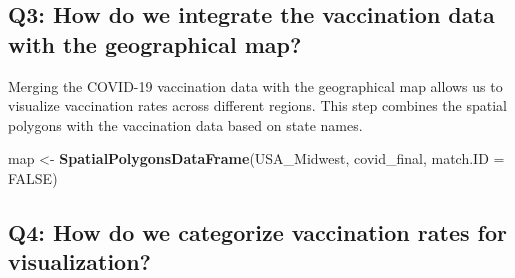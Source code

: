 \documentclass[
]{book}
\newenvironment{Shaded}{\begin{snugshade}}{\end{snugshade}}
\newcommand{\AttributeTok}[1]{\textcolor[rgb]{0.13,0.29,0.53}{#1}}
\newcommand{\ConstantTok}[1]{\textcolor[rgb]{0.56,0.35,0.01}{#1}}
\newcommand{\FunctionTok}[1]{\textcolor[rgb]{0.13,0.29,0.53}{\textbf{#1}}}
\newcommand{\NormalTok}[1]{#1}
\newcommand{\OtherTok}[1]{\textcolor[rgb]{0.56,0.35,0.01}{#1}}
\newcommand{\SpecialCharTok}[1]{\textcolor[rgb]{0.81,0.36,0.00}{\textbf{#1}}}
\newcommand{\StringTok}[1]{\textcolor[rgb]{0.31,0.60,0.02}{#1}}
\begin{document}
\begin{Shaded}
\end{Shaded}

\hypertarget{q3-how-do-we-integrate-the-vaccination-data-with-the-geographical-map}{%
\subsection{Q3: How do we integrate the vaccination data with the geographical map?}\label{q3-how-do-we-integrate-the-vaccination-data-with-the-geographical-map}}

Merging the COVID-19 vaccination data with the geographical map allows us to visualize vaccination rates across different regions. This step combines the spatial polygons with the vaccination data based on state names.

\begin{Shaded}
\begin{Highlighting}[]
\NormalTok{map }\OtherTok{\textless{}{-}} \FunctionTok{SpatialPolygonsDataFrame}\NormalTok{(USA\_Midwest, covid\_final, }\AttributeTok{match.ID =} \ConstantTok{FALSE}\NormalTok{)}
\end{Highlighting}
\end{Shaded}

\hypertarget{q4-how-do-we-categorize-vaccination-rates-for-visualization}{%
\subsection{Q4: How do we categorize vaccination rates for visualization?}\label{q4-how-do-we-categorize-vaccination-rates-for-visualization}}
\end{document}
